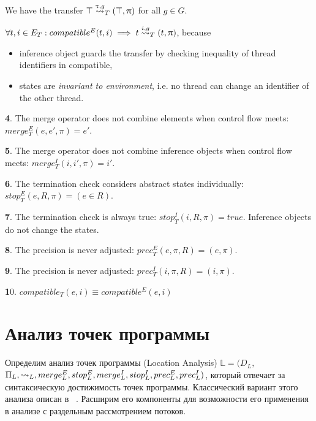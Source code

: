 We have the transfer $\top \stackrel{\uptau, g}{\leadsto}_T (\top, \uppi)$ for all $g\in G$.

$\forall t,i \in E_T: compatible^E(t,i) \implies t \stackrel{i, g}{\leadsto}_T (t, \uppi)$, because 
\begin{itemize}
\item inference object guards the transfer by checking inequality of thread identifiers in compatible,
\item states are {\em invariant to environment}, i.e. no thread can change an identifier of the other thread.
\end{itemize}

{\textbf 4.} The merge operator does not combine elements when control flow meets: $merge^E_T(e, e', \pi) = e'$.

{\textbf 5.} The merge operator does not combine inference objects when control flow meets: $merge^I_T(i, i', \pi) = i'$.

{\textbf 6.} The termination check considers abstract states individually: $stop^E_T(e, R, \pi) = (e \in R)$.

{\textbf 7.} The termination check is always true: $stop^I_T(i, R, \pi) = true$. Inference objects do not change the states.

{\textbf 8.} The precision is never adjusted: $prec^E_T(e, \pi, R) = (e, \pi)$.

{\textbf 9.} The precision is never adjusted: $prec^I_T(i, \pi, R) = (i, \pi)$.

{\textbf 10.} $compatible_T(e,i) \equiv compatible^E(e,i)$

\section{Анализ точек программы}
\label{sect_location_analysis}

Определим анализ точек программы (Location Analysis)
$\mathbb{L}=(D_{L},$ $\Pi_{L}, \leadsto_{L}, merge^E_{L}, stop^E_{L}, merge^I_{L}, stop^I_{L}, prec^E_{L},prec^I_{L})$, который отвечает за синтаксическую достижимость точек программы.
Классический вариант этого анализа описан в ~\cite{Beyer08}.
Расширим его компоненты для возможности его применения в анализе с раздельным рассмотрением потоков.
 

